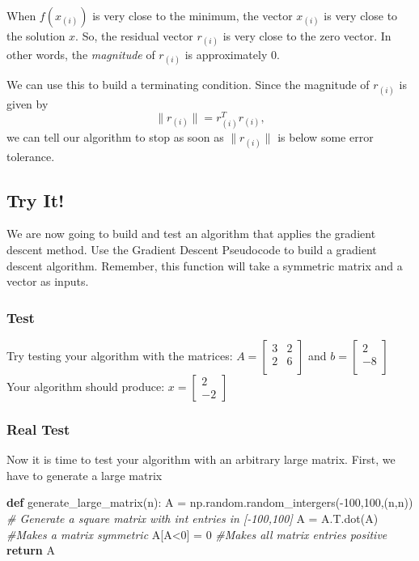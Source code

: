 \documentclass{article}
\newenvironment{Shaded}{}{}
\newcommand{\KeywordTok}[1]{\textcolor[rgb]{0.00,0.44,0.13}{\textbf{{#1}}}}
\newcommand{\DecValTok}[1]{\textcolor[rgb]{0.25,0.63,0.44}{{#1}}}
\newcommand{\CommentTok}[1]{\textcolor[rgb]{0.38,0.63,0.69}{\textit{{#1}}}}
\newcommand{\NormalTok}[1]{{#1}}
\begin{document}
When $f(x_{(i)})$ is very close to the minimum, the vector $x_{(i)}$ is
very close to the solution $x$. So, the residual vector $r_{(i)}$ is
very close to the zero vector. In other words, the \emph{magnitude} of
$r_{(i)}$ is approximately 0.

We can use this to build a terminating condition. Since the magnitude of
$r_{(i)}$ is given by \[\|r_{(i)}\| = r_{(i)}^Tr_{(i)},\] we can tell
our algorithm to stop as soon as $\|r_{(i)}\|$ is below some error
tolerance.

\subsection{Try It!}\label{try-it}

We are now going to build and test an algorithm that applies the
gradient descent method. Use the Gradient Descent Pseudocode to build a
gradient descent algorithm. Remember, this function will take a
symmetric matrix and a vector as inputs.

\subsubsection{Test}\label{test}

Try testing your algorithm with the matrices:
$A = \begin{bmatrix} 3 & 2 \\ 2 & 6 \\ \end{bmatrix}$ and
$b = \begin{bmatrix} 2 \\ -8\\ \end{bmatrix}$ Your algorithm should
produce: $x = \begin{bmatrix} 2 \\ -2 \end{bmatrix}$

\subsubsection{Real Test}\label{real-test}

Now it is time to test your algorithm with an arbitrary large matrix.
First, we have to generate a large matrix

\begin{Shaded}
\begin{Highlighting}[]
\KeywordTok{def} \NormalTok{generate_large_matrix(n):}
    \NormalTok{A = np.random.random_intergers(-}\DecValTok{100}\NormalTok{,}\DecValTok{100}\NormalTok{,(n,n)) }\CommentTok{# Generate a square matrix with int entries in [-100,100]}
    \NormalTok{A = A.T.dot(A) }\CommentTok{#Makes a matrix symmetric}
    \NormalTok{A[A<}\DecValTok{0}\NormalTok{] = }\DecValTok{0} \CommentTok{#Makes all matrix entries positive}
    \KeywordTok{return} \NormalTok{A}
\end{Highlighting}
\end{Shaded}
\end{document}
